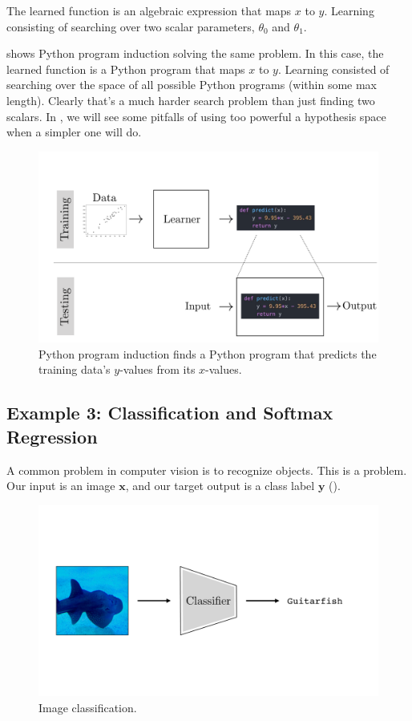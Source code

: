 The learned function is an algebraic expression that maps $x$ to $y$. Learning consisting of searching over two scalar parameters, $\theta_0$ and $\theta_1$.

\Fig{\ref{fig:intro_to_learning:program_induction_system_diagram}} shows Python program induction solving the same problem. In this case, the learned function is a Python program that maps $x$ to $y$. Learning consisted of searching over the space of all possible Python programs (within some max length). Clearly that's a much harder search problem than just finding two scalars. In \chap{\ref{chapter:problem_of_generalization}}, we will see some pitfalls of using too powerful a hypothesis space when a simpler one will do.

\begin{figure}[h]
    \centerline{
    \includegraphics[width=0.8\linewidth]{./figures/intro_to_learning/program_induction_system_diagram.pdf}
    }
    \caption{Python program induction finds a Python program that predicts the training data's $y$-values from its $x$-values.}
    \label{fig:intro_to_learning:program_induction_system_diagram}
\end{figure}

\subsection{Example 3: Classification and Softmax Regression}\label{sec:intro_to_learning:image_classification}

A common problem in computer vision is to recognize objects. This is a  problem. Our input is an image $\mathbf{x}$, and our target output is a class label $\mathbf{y}$ (\fig{\ref{fig:intro_to_learning:image_classification}}).

\begin{figure}[h]
    \centerline{
    \includegraphics[width=0.7\linewidth]{./figures/intro_to_learning/image_classification.pdf}
    }
    \caption{Image classification.}
    \label{fig:intro_to_learning:image_classification}
\end{figure}


